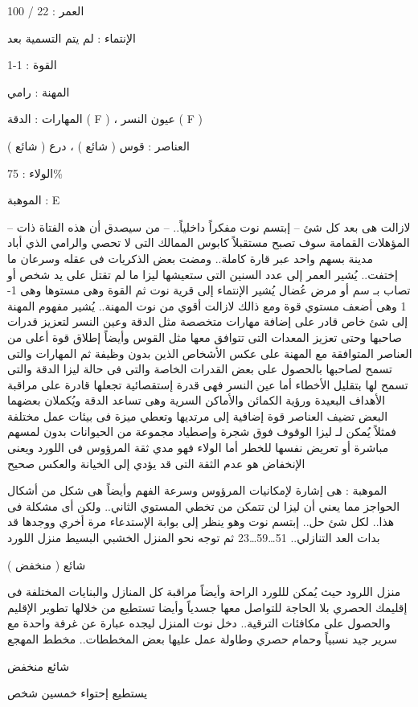 العمر : 22 / 100

الإنتماء : لم يتم التسمية بعد

القوة : 1-1

المهنة : رامي

المهارات : الدقة ( F ) ، عيون النسر ( F )

العناصر : قوس ( شائع ) ، درع ( شائع )

الولاء : 75\%

الموهبة : E

– لازالت هى بعد كل شئ – إبتسم نوت مفكراً داخلياً.. – من سيصدق أن هذه الفتاة ذات المؤهلات القمامة سوف تصبح مستقبلاً كابوس الممالك التى لا تحصي والرامي الذي أباد مدينة بسهم واحد عبر قارة كاملة..
ومضت بعض الذكريات فى عقله وسرعان ما إختفت..
يُشير العمر إلى عدد السنين التى ستعيشها ليزا ما لم تقتل على يد شخص أو تصاب بـ سم أو مرض عُضال
يُشير الإنتماء إلى قرية نوت
ثم القوة وهى مستوها وهى 1-1 وهى أضعف مستوي قوة ومع ذالك لازالت أقوي من نوت
المهنة.. يُشير مفهوم المهنة إلى شئ خاص قادر على إضافة مهارات متخصصة مثل الدقة وعين النسر لتعزيز قدرات صاحبها وحتى تعزيز المعدات التى تتوافق معها مثل القوس وأيضاً إطلاق قوة أعلى من العناصر المتوافقة مع المهنة على عكس الأشخاص الذين بدون وظيفة
ثم المهارات والتى تسمح لصاحبها بالحصول على بعض القدرات الخاصة والتى فى حالة ليزا الدقة والتى تسمح لها بتقليل الأخطاء أما عين النسر فهى قدرة إستقصائية تجعلها قادرة على مراقبة الأهداف البعيدة ورؤية الكمائن والأماكن السرية وهى تساعد الدقة ويُكملان بعضهما البعض
تضيف العناصر قوة إضافية إلى مرتديها وتعطي ميزة فى بيئات عمل مختلفة فمثلاً يُمكن لـ ليزا الوقوف فوق شجرة وإصطياد مجموعة من الحيوانات بدون لمسهم مباشرة أو تعريض نفسها للخطر
أما الولاء فهو مدي ثقة المرؤوس فى اللورد ويعنى الإنخفاض هو عدم الثقة التى قد يؤدي إلى الخيانة والعكس صحيح

الموهبة : هى إشارة لإمكانيات المرؤوس وسرعة الفهم وأيضاً هى شكل من أشكال الحواجز مما يعني أن ليزا لن تتمكن من تخطي المستوي الثاني..
ولكن أى مشكلة فى هذا.. لكل شئ حل.. إبتسم نوت وهو ينظر إلى بوابة الإستدعاء مرة أخري ووجدها قد بدات العد التنازلي..
51…59…23
ثم توجه نحو المنزل الخشبي البسيط
منزل اللورد

شائع ( منخفض )

منزل اللرود حيث يُمكن لللورد الراحة وأيضاً مراقبة كل المنازل والبنايات المختلفة فى إقليمك الحصري بلا الحاجة للتواصل معها جسدياً وأيضا تستطيع من خلالها تطوير الإقليم والحصول على مكافئات الترقية..
دخل نوت المنزل ليجده عبارة عن غرفة واحدة مع سرير جيد نسبياً وحمام حصري وطاولة عمل عليها بعض المخططات..
مخطط المهجع

شائع منخفض

يستطيع إحتواء خمسين شخص

